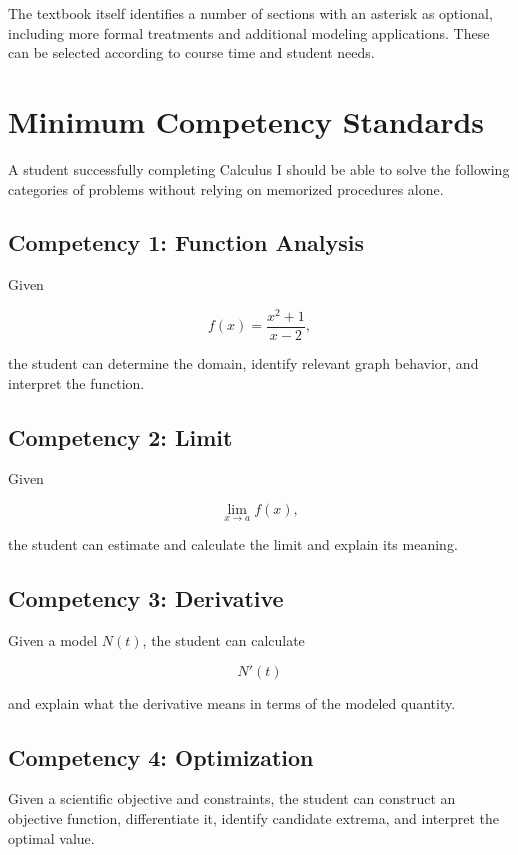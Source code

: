 \documentclass[11pt]{article}
\begin{document}
The textbook itself identifies a number of sections with an asterisk as
optional, including more formal treatments and additional modeling
applications. These can be selected according to course time and student
needs.

\section{Minimum Competency Standards}

A student successfully completing Calculus I should be able to solve the
following categories of problems without relying on memorized procedures
alone.

\subsection*{Competency 1: Function Analysis}

Given

\[
f(x)=\frac{x^2+1}{x-2},
\]

the student can determine the domain, identify relevant graph behavior, and
interpret the function.

\subsection*{Competency 2: Limit}

Given

\[
\lim_{x\to a}f(x),
\]

the student can estimate and calculate the limit and explain its meaning.

\subsection*{Competency 3: Derivative}

Given a model $N(t)$, the student can calculate

\[
N'(t)
\]

and explain what the derivative means in terms of the modeled quantity.

\subsection*{Competency 4: Optimization}

Given a scientific objective and constraints, the student can construct an
objective function, differentiate it, identify candidate extrema, and
interpret the optimal value.
\end{document}
